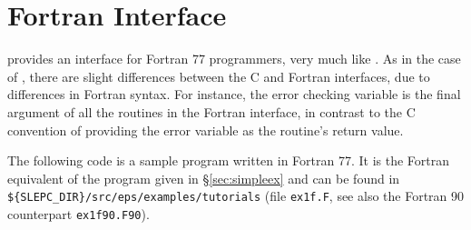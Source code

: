 \section{Fortran Interface}
\label{sec:fortran}

	\slepc provides an interface for Fortran 77 programmers, very much like \petsc. As in the case of \petsc, there are slight differences between the C and Fortran \slepc interfaces, due to differences in Fortran syntax. For instance, the error checking variable is the final argument of all the routines in the Fortran interface, in contrast to the C convention of providing the error variable as the routine's return value.

	The following code is a sample program written in Fortran 77. It is the Fortran equivalent of the program given in \S\ref{sec:simpleex} and can be found in \Verb!${SLEPC_DIR}/src/eps/examples/tutorials! (file \texttt{ex1f.F}, see also the Fortran 90 counterpart \texttt{ex1f90.F90}).

%
%
%

